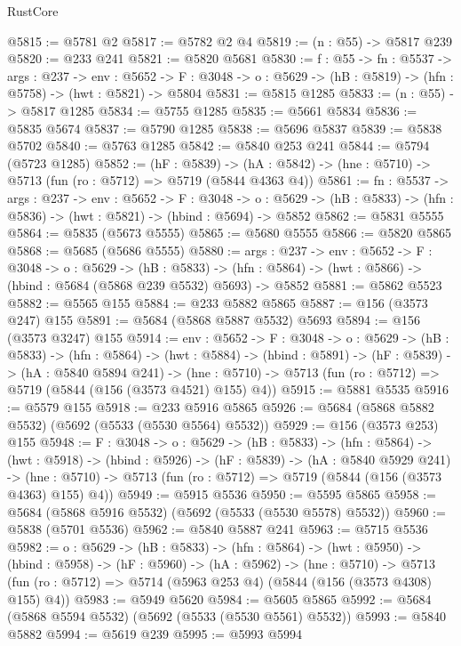 \begin{lexlean}{RustCore}
\begin{coremodule}
@5815 := @5781 @2
@5817 := @5782 @2 @4
@5819 := (n : @55) -> @5817 @239
@5820 := @233 @241
@5821 := @5820 @5681
@5830 := {f : @55} ->
  {fn : @5537} ->
  {args : @237} ->
  {env : @5652} ->
  {F : @3048} -> {o : @5629} -> (hB : @5819) -> (hfn : @5758) -> (hwt : @5821) -> @5804
@5831 := @5815 @1285
@5833 := (n : @55) -> @5817 @1285
@5834 := @5755 @1285
@5835 := @5661 @5834
@5836 := @5835 @5674
@5837 := @5790 @1285
@5838 := @5696 @5837
@5839 := @5838 @5702
@5840 := @5763 @1285
@5842 := @5840 @253 @241
@5844 := @5794 (@5723 @1285)
@5852 := (hF : @5839) ->
  (hA : @5842) -> (hne : @5710) -> @5713 (fun (ro : @5712) => @5719 (@5844 @4363 @4))
@5861 := {fn : @5537} ->
  {args : @237} ->
  {env : @5652} ->
  {F : @3048} ->
  {o : @5629} -> (hB : @5833) -> (hfn : @5836) -> (hwt : @5821) -> (hbind : @5694) -> @5852
@5862 := @5831 @5555
@5864 := @5835 (@5673 @5555)
@5865 := @5680 @5555
@5866 := @5820 @5865
@5868 := @5685 (@5686 @5555)
@5880 := {args : @237} ->
  {env : @5652} ->
  {F : @3048} ->
  {o : @5629} ->
  (hB : @5833) ->
  (hfn : @5864) -> (hwt : @5866) -> (hbind : @5684 (@5868 @239 @5532) @5693) -> @5852
@5881 := @5862 @5523
@5882 := @5565 @155
@5884 := @233 @5882 @5865
@5887 := @156 (@3573 @247) @155
@5891 := @5684 (@5868 @5887 @5532) @5693
@5894 := @156 (@3573 @3247) @155
@5914 := {env : @5652} ->
  {F : @3048} ->
  {o : @5629} ->
  (hB : @5833) ->
  (hfn : @5864) ->
  (hwt : @5884) ->
  (hbind : @5891) ->
  (hF : @5839) ->
  (hA : @5840 @5894 @241) ->
  (hne : @5710) -> @5713 (fun (ro : @5712) => @5719 (@5844 (@156 (@3573 @4521) @155) @4))
@5915 := @5881 @5535
@5916 := @5579 @155
@5918 := @233 @5916 @5865
@5926 := @5684 (@5868 @5882 @5532) (@5692 (@5533 (@5530 @5564) @5532))
@5929 := @156 (@3573 @253) @155
@5948 := {F : @3048} ->
  {o : @5629} ->
  (hB : @5833) ->
  (hfn : @5864) ->
  (hwt : @5918) ->
  (hbind : @5926) ->
  (hF : @5839) ->
  (hA : @5840 @5929 @241) ->
  (hne : @5710) -> @5713 (fun (ro : @5712) => @5719 (@5844 (@156 (@3573 @4363) @155) @4))
@5949 := @5915 @5536
@5950 := @5595 @5865
@5958 := @5684 (@5868 @5916 @5532) (@5692 (@5533 (@5530 @5578) @5532))
@5960 := @5838 (@5701 @5536)
@5962 := @5840 @5887 @241
@5963 := @5715 @5536
@5982 := {o : @5629} ->
  (hB : @5833) ->
  (hfn : @5864) ->
  (hwt : @5950) ->
  (hbind : @5958) ->
  (hF : @5960) ->
  (hA : @5962) ->
  (hne : @5710) ->
  @5713 (fun (ro : @5712) => @5714 (@5963 @253 @4) (@5844 (@156 (@3573 @4308) @155) @4))
@5983 := @5949 @5620
@5984 := @5605 @5865
@5992 := @5684 (@5868 @5594 @5532) (@5692 (@5533 (@5530 @5561) @5532))
@5993 := @5840 @5882
@5994 := @5619 @239
@5995 := @5993 @5994

\end{coremodule}
\end{lexlean}
